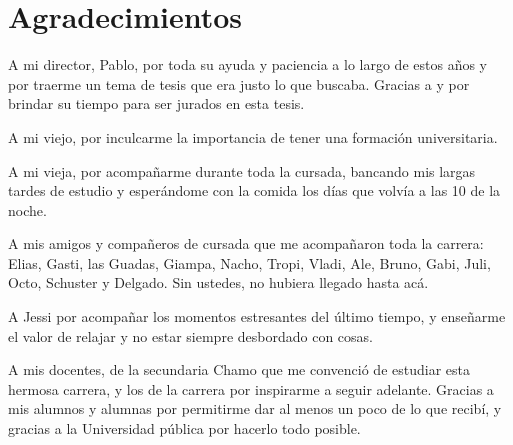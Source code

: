 \chapter*{Agradecimientos}

\noindent 

A mi director, Pablo, por toda su ayuda y paciencia a lo largo de estos años y
por traerme un tema de tesis que era justo lo que buscaba. Gracias a \todo{[nombre1]} y \todo{[nombre2]} por brindar su tiempo para ser jurados en esta tesis.

A mi viejo, por inculcarme la importancia de tener una formación universitaria.

A mi vieja, por acompañarme durante toda la cursada, bancando mis largas tardes
de estudio y esperándome con la comida los días que volvía a las 10 de la noche.

A mis amigos y compañeros de cursada que me acompañaron toda la carrera: Elias,
Gasti, las Guadas, Giampa, Nacho, Tropi, Vladi, Ale, Bruno, Gabi, Juli, Octo,
Schuster y Delgado. Sin ustedes, no hubiera llegado hasta acá.

A Jessi por acompañar los momentos estresantes del último tiempo, y enseñarme el
valor de relajar y no estar siempre desbordado con cosas.

A mis docentes, de la secundaria Chamo que me convenció de estudiar esta
hermosa carrera, y los de la carrera por inspirarme a seguir adelante. Gracias a
mis alumnos y alumnas por permitirme dar al menos un poco de lo que recibí, y
gracias a la Universidad pública por hacerlo todo posible.